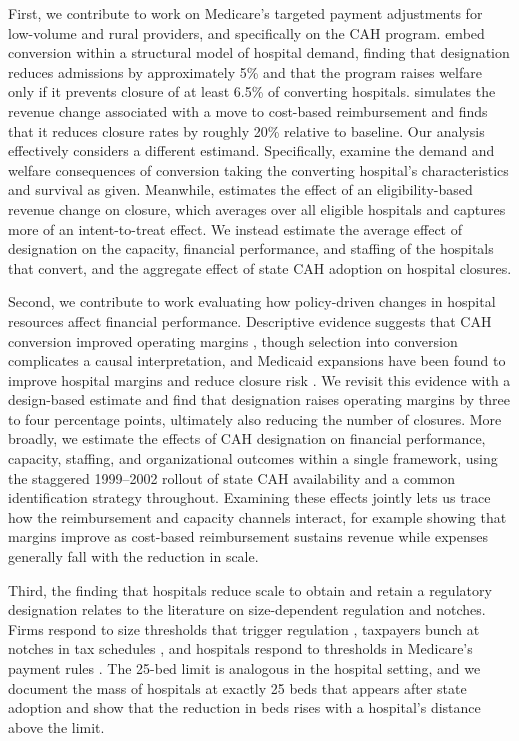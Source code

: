 \documentclass[a4paper, 12pt, twoside]{article}
\begin{document}
First, we contribute to work on Medicare's targeted payment adjustments for low-volume and rural providers, and specifically on the CAH program. \cite{gowrisankaran2018} embed conversion within a structural model of hospital demand, finding that designation reduces admissions by approximately 5\% and that the program raises welfare only if it prevents closure of at least 6.5\% of converting hospitals. \cite{carroll2025} simulates the revenue change associated with a move to cost-based reimbursement and finds that it reduces closure rates by roughly 20\% relative to baseline. Our analysis effectively considers a different estimand. Specifically, \cite{gowrisankaran2018} examine the demand and welfare consequences of conversion taking the converting hospital's characteristics and survival as given. Meanwhile, \cite{carroll2025} estimates the effect of an eligibility-based revenue change on closure, which averages over all eligible hospitals and captures more of an intent-to-treat effect. We instead estimate the average effect of designation on the capacity, financial performance, and staffing of the hospitals that convert, and the aggregate effect of state CAH adoption on hospital closures.

Second, we contribute to work evaluating how policy-driven changes in hospital resources affect financial performance. Descriptive evidence suggests that CAH conversion improved operating margins \citep{stensland2003, li2009}, though selection into conversion complicates a causal interpretation, and Medicaid expansions have been found to improve hospital margins and reduce closure risk \citep{blavin2016, lindrooth2018, blavin2021}. We revisit this evidence with a design-based estimate and find that designation raises operating margins by three to four percentage points, ultimately also reducing the number of closures. More broadly, we estimate the effects of CAH designation on financial performance, capacity, staffing, and organizational outcomes within a single framework, using the staggered 1999--2002 rollout of state CAH availability and a common identification strategy throughout. Examining these effects jointly lets us trace how the reimbursement and capacity channels interact, for example showing that margins improve as cost-based reimbursement sustains revenue while expenses generally fall with the reduction in scale.

Third, the finding that hospitals reduce scale to obtain and retain a regulatory designation relates to the literature on size-dependent regulation and notches. Firms respond to size thresholds that trigger regulation \citep{garicano2016}, taxpayers bunch at notches in tax schedules \citep{kleven2013, kleven2016}, and hospitals respond to thresholds in Medicare's payment rules \citep{eliason2018}. The 25-bed limit is analogous in the hospital setting, and we document the mass of hospitals at exactly 25 beds that appears after state adoption and show that the reduction in beds rises with a hospital's distance above the limit.
\end{document}
